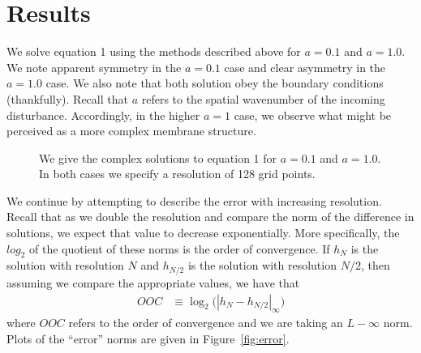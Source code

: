 \documentclass[10pt]{article}
\begin{document}
\section*{Results}
We solve equation 1 using the methods described above for $a = 0.1$ and $a = 1.0$.
We note apparent symmetry in the $a = 0.1$ case and clear asymmetry in the $a = 1.0$ case. 
We also note that both solution obey the boundary conditions (thankfully).
Recall that $a$ refers to the spatial wavenumber of the incoming disturbance.
Accordingly, in the higher $a = 1$ case, we observe what might be perceived as a more complex membrane structure.

\begin{figure}[H]
    \centering
    \vspace{0.3cm}
    \caption{We give the complex solutions to equation 1 for $a = 0.1$ and $a = 1.0$. In both cases we specify a resolution of 128 grid points.}
    \label{solns1}
\end{figure}
\clearpage
We continue by attempting to describe the error with increasing resolution. Recall that as we double the resolution and compare the norm of the difference in solutions, we expect that value to decrease exponentially.
More specifically, the $log_2$ of the quotient of these norms is the order of convergence. 
If $h_{N}$ is the solution with resolution $N$ and $h_{N/2}$ is the solution with resolution $N/2$, then assuming we compare the appropriate values, we have that
\begin{align}
    OOC &\equiv \log_2 \Big( |h_{N} - h_{N/2}|_{\infty} \Big)
\end{align}
where $OOC$ refers to the order of convergence and we are taking an $L-\infty$ norm.
Plots of the ``error'' norms are given in Figure~\ref{fig:error}.
\end{document}

